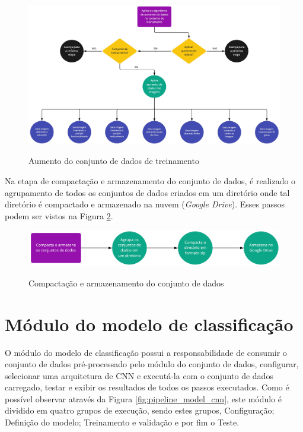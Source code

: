 \documentclass[
	12pt,				%
	oneside,			%
	a4paper,			%
	english,			%
	brazil				%
	]{abntex2ppgsi}
\begin{document}
\begin{figure}[H]
    \centering
    \caption{Aumento do conjunto de dados de treinamento}
    \includegraphics[width=1.0\textwidth]{imagens/materiais_metodos/modulo_conjunto_dados/pipeline_geracao_do_dataset_aumento_de_dados.jpg}
    \label{fig:pipeline_geracao_do_dataset_aumento_de_dados}
\end{figure}

Na etapa de compactação e armazenamento do conjunto de dados, é realizado o agrupamento de todos os conjuntos de dados criados em um diretório onde tal diretório é compactado e armazenado na nuvem (\textit{Google Drive}). Esses passos podem ser vistos na Figura \ref{fig:pipeline_geracao_do_dataset_compacta}.

\begin{figure}[H]
    \centering
    \caption{Compactação e armazenamento do conjunto de dados}
    \includegraphics[width=1.0\textwidth]{imagens/materiais_metodos/modulo_conjunto_dados/pipeline_geracao_do_dataset_compacta.jpg}
    \label{fig:pipeline_geracao_do_dataset_compacta}
\end{figure}

\section{Módulo do modelo de classificação}
O módulo do modelo de classificação possui a responsabilidade de consumir o conjunto de dados pré-processado pelo módulo do conjunto de dados, configurar, selecionar uma arquitetura de CNN e executá-la com o conjunto de dados carregado, testar e exibir os resultados de todos os passos executados. Como é possível observar através da Figura \ref{fig:pipeline_model_cnn}, este módulo é dividido em quatro grupos de execução, sendo estes grupos, Configuração; Definição do modelo; Treinamento e validação e por fim o Teste.
\end{document}
